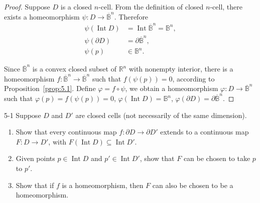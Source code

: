\begin{proof}
	Suppose $D$ is a closed $n$-cell. From the definition of closed $n$-cell, there exists a homeomorphism $\psi: D \to \overline{\mathbb{B}}^{n}$. Therefore
	\begin{align*}
		\psi(\operatorname{Int} D) & = \operatorname{Int} \overline{\mathbb{B}}^{n} = \mathbb{B}^{n}, \\
		\psi(\partial D)           & = \partial \overline{\mathbb{B}}^{n},                            \\
		\psi(p)                    & \in \mathbb{B}^{n}.
	\end{align*}

	Since $\overline{\mathbb{B}}^{n}$ is a convex closed subset of $\mathbb{R}^{n}$ with nonempty interior, there is a homeomorphism $f: \overline{\mathbb{B}}^{n} \to \overline{\mathbb{B}}^{n}$ such that $f(\psi(p)) = 0$, according to Proposition~\ref{prop:5.1}. Define $\varphi = f\circ \psi$, we obtain a homeomorphism $\varphi: D \to \overline{\mathbb{B}}^{n}$ such that $\varphi(p) = f(\psi(p)) = 0$, $\varphi(\operatorname{Int} D) = \mathbb{B}^{n}$, $\varphi(\partial D) = \partial \overline{\mathbb{B}}^{n}$.
\end{proof}

\begin{problem}{5-1}\label{problem:5-1}
Suppose $D$ and $D'$ are closed cells (not necessarily of the same dimension).
\begin{enumerate}[label={(\alph*)}]
	\item Show that every continuous map $f: \partial D \to \partial D'$ extends to a continuous map $F: D \to D'$, with $F(\operatorname{Int} D) \subseteq \operatorname{Int} D'$.
	\item Given points $p \in \operatorname{Int} D$ and $p' \in \operatorname{Int} D'$, show that $F$ can be chosen to take $p$ to $p'$.
	\item Show that if $f$ is a homeomorphism, then $F$ can also be chosen to be a homeomorphism.
\end{enumerate}
\end{problem}

